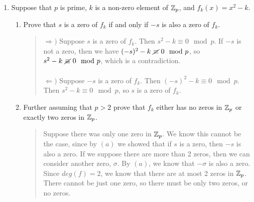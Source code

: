 \documentclass{hw}
\begin{document}
\begin{enumerate}
\item Suppose that $p$ is prime, $k$ is a non-zero element of $\mathbb{Z}_{p}$, and $f_{k}(x)=x^{2}-k$.
\begin{enumerate}
\item Prove that $s$ is a zero of $f_{k}$ if and only if $-s$ is also a zero of $f_{k}$.
\begin{quote}
$\Rightarrow)$ Suppose $s$ is a zero of $f_{k}$. Then $s^{2}-k\equiv0\mod p$. If $-s$ is not a zero,
then we have $(-s)^{2}-k\ \cancel{\equiv}\ 0\mod p$, so $s^{2}-k\ \cancel{\equiv}\ 0\mod p$, which
is a contradiction.\\\\
$\Leftarrow)$ Suppose $-s$ is a zero of $f_{k}$. Then $(-s)^{2}-k\equiv0\mod p$. Then
$s^{2}-k\equiv0\mod p$, so $s$ is a zero of $f_{k}$.
\end{quote}
\item Further assuming that $p>2$ prove that $f_{k}$ either has no zeros in $\mathbb{Z}_{p}$ or exactly
two zeros in $\mathbb{Z}_{p}$.
\begin{quote}
Suppose there was only one zero in $\mathbb{Z}_{p}$. We know this cannot be the case, since by $(a)$ we
showed that if $s$ is a zero, then $-s$ is also a zero. If we suppose there are more than 2 zeros,
then we can consider another zero, $\sigma$. By $(a)$, we know that $-\sigma$ is also a zero. Since
$deg(f)=2$, we know that there are at most 2 zeros in $\mathbb{Z}_{p}$. There cannot be just one zero, so
there must be only two zeros, or no zeros.
\end{quote}
\end{enumerate}


\end{enumerate}
\end{document}
